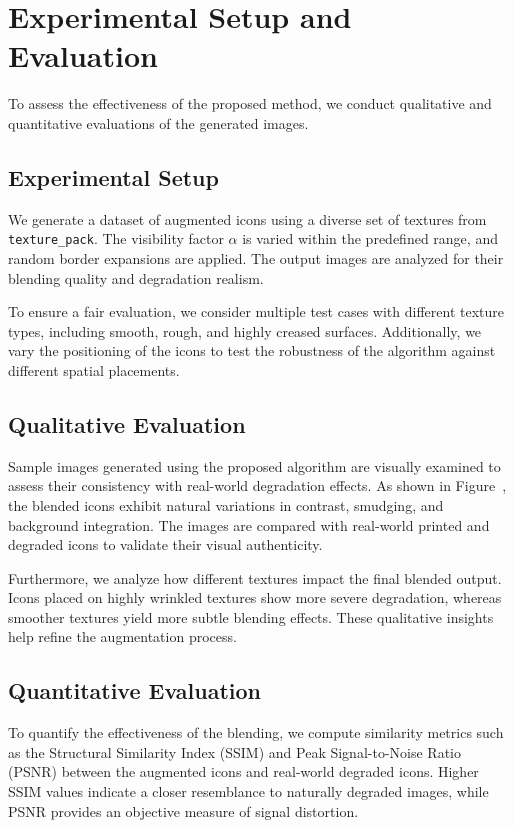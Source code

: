 \section{Experimental Setup and Evaluation}

To assess the effectiveness of the proposed method, we conduct qualitative and quantitative evaluations of the generated images.

\subsection{Experimental Setup}

We generate a dataset of augmented icons using a diverse set of textures from \texttt{texture\_pack}. The visibility factor $\alpha$ is varied within the predefined range, and random border expansions are applied. The output images are analyzed for their blending quality and degradation realism.

To ensure a fair evaluation, we consider multiple test cases with different texture types, including smooth, rough, and highly creased surfaces. Additionally, we vary the positioning of the icons to test the robustness of the algorithm against different spatial placements.

\subsection{Qualitative Evaluation}

Sample images generated using the proposed algorithm are visually examined to assess their consistency with real-world degradation effects. As shown in Figure~, the blended icons exhibit natural variations in contrast, smudging, and background integration. The images are compared with real-world printed and degraded icons to validate their visual authenticity.

Furthermore, we analyze how different textures impact the final blended output. Icons placed on highly wrinkled textures show more severe degradation, whereas smoother textures yield more subtle blending effects. These qualitative insights help refine the augmentation process.

\subsection{Quantitative Evaluation}

To quantify the effectiveness of the blending, we compute similarity metrics such as the Structural Similarity Index (SSIM) and Peak Signal-to-Noise Ratio (PSNR) between the augmented icons and real-world degraded icons. Higher SSIM values indicate a closer resemblance to naturally degraded images, while PSNR provides an objective measure of signal distortion.

